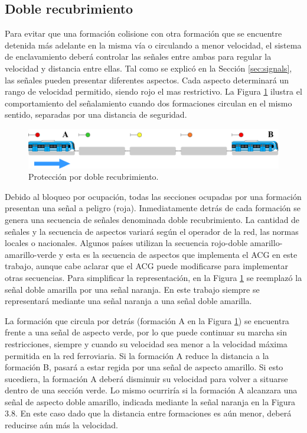 \subsection{Doble recubrimiento}

	\label{sec:function_5}
	
	Para evitar que una formación colisione con otra formación que se encuentre detenida más adelante en la misma vía o circulando a menor velocidad, el sistema de enclavamiento deberá controlar las señales entre ambas para regular la velocidad y distancia entre ellas. Tal como se explicó en la Sección \ref{sec:signals}, las señales pueden presentar diferentes aspectos. Cada aspecto determinará un rango de velocidad permitido, siendo rojo el mas restrictivo. La Figura \ref{fig:ACG_recrubrimiento_1} ilustra el comportamiento del señalamiento cuando dos formaciones circulan en el mismo sentido, separadas por una distancia de seguridad.
	
	\begin{figure}[!h]
		\centering
		\includegraphics[width=1\textwidth]{Figuras/recubrimiento}
		\centering\caption{Protección por doble recubrimiento.}
		\label{fig:ACG_recrubrimiento_1}
	\end{figure}
	
	Debido al bloqueo por ocupación, todas las secciones ocupadas por una formación presentan una señal a peligro (roja). Inmediatamente detrás de cada formación se genera una secuencia de señales denominada doble recubrimiento. La cantidad de señales y la secuencia de aspectos variará según el operador de la red, las normas locales o nacionales. Algunos países utilizan la secuencia rojo-doble amarillo-amarillo-verde y esta es la secuencia de aspectos que implementa el ACG en este trabajo, aunque cabe aclarar que el ACG puede modificarse para implementar otras secuencias. Para simplificar la representación, en la Figura \ref{fig:ACG_recrubrimiento_1} se reemplazó la señal doble amarilla por una señal naranja. En este trabajo siempre se representará mediante una señal naranja a una señal doble amarilla.
	
	La formación que circula por detrás (formación A en la Figura \ref{fig:ACG_recrubrimiento_1}) se encuentra frente a una señal de aspecto verde, por lo
	que puede continuar su marcha sin restricciones, siempre y cuando su velocidad sea menor a la velocidad máxima permitida en la red ferroviaria. Si la formación A reduce la distancia a la formación B, pasará a estar regida por una señal de aspecto amarillo. Si esto sucediera, la formación A deberá disminuir su velocidad para volver a situarse dentro de una sección verde. Lo mismo ocurriría si la formación A alcanzara una señal de aspecto doble amarillo, indicada mediante la señal naranja en la Figura 3.8. En este caso dado que la distancia entre formaciones es aún menor, deberá reducirse aún más la velocidad.
	

